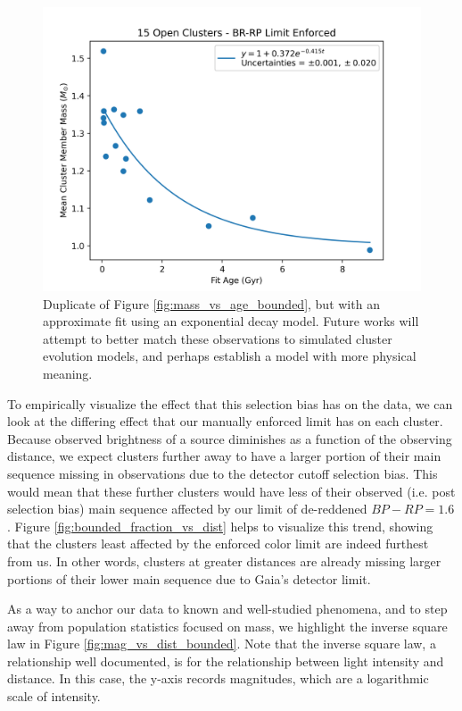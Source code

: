\documentclass[onecolumn,table,xcdraw,super]{aastex631}
\begin{document}
\begin{figure}[]
    \centering
      \includegraphics[width=4.75in]{figures/mass_vs_age_bounded_fit.png}
    \caption{Duplicate of Figure \ref{fig:mass_vs_age_bounded}, but with an approximate fit using an exponential decay model. Future works will attempt to better match these observations to simulated cluster evolution models, and perhaps establish a model with more physical meaning.}
    \label{fig:mass_vs_age_bounded_fit}
\end{figure}

To empirically visualize the effect that this selection bias has on the data, we can look at the differing effect that our manually enforced limit has on each cluster. Because observed brightness of a source diminishes as a function of the observing distance, we expect clusters further away to have a larger portion of their main sequence missing in observations due to the detector cutoff selection bias. This would mean that these further clusters would have less of their observed (i.e. post selection bias) main sequence affected by our limit of de-reddened $BP-RP = 1.6$. Figure \ref{fig:bounded_fraction_vs_dist} helps to visualize this trend, showing that the clusters least affected by the enforced color limit are indeed furthest from us. In other words, clusters at greater distances are already missing larger portions of their lower main sequence due to Gaia's detector limit.

As a way to anchor our data to known and well-studied phenomena, and to step away from population statistics focused on mass, we highlight the inverse square law in Figure \ref{fig:mag_vs_dist_bounded}. Note that the inverse square law, a relationship well documented, is for the relationship between light intensity and distance. In this case, the y-axis records magnitudes, which are a logarithmic scale of intensity. 
\end{document}
